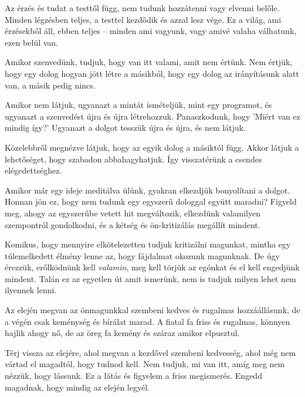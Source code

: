 Az érzés és tudat a testtől függ, nem tudunk hozzátenni vagy elvenni
belőle. Minden légzésben teljes, a testtel kezdődik és azzal lesz vége.
Ez a világ, ami érzésekből áll, ebben teljes -- minden ami vagyunk, vagy
amivé valaha válhatunk, ezen belül van.

Amikor szenvedünk, tudjuk, hogy van itt valami, amit nem értünk. Nem
értjük, hogy egy dolog hogyan jött létre a másikból, hogy egy dolog az
irányításunk alatt van, a másik pedig nincs.

Amikor nem látjuk, ugyanazt a mintát ismételjük, mint egy programot, és
ugyanazt a szenvedést újra és újra létrehozzuk. Panaszkodunk, hogy
'Miért van ez mindig így?' Ugyanazt a dolgot tesszük újra és újra, és
nem látjuk.

Közelebbről megnézve látjuk, hogy az egyik dolog a másiktól függ. Akkor
látjuk a lehetőséget, hogy szabadon abbahagyhatjuk. Így visszatérünk a
csendes elégedettséghez.

Amikor már egy ideje meditálva ülünk, gyakran elkezdjük bonyolítani a
dolgot. Honnan jön ez, hogy nem tudunk egy egyszerű dologgal együtt
maradni? Figyeld meg, ahogy az egyszerűbe vetett hit megváltozik,
elkezdünk valamilyen szempontról gondolkodni, és a kétség és
ön-kritizálás megállít mindent.

Komikus, hogy mennyire elkötelezetten tudjuk kritizálni magunkat, mintha
egy túlemelkedett élmény lenne az, hogy fájdalmat okozunk magunknak. De
úgy érezzük, erőlködnünk kell \emph{valamin}, meg kell törjük az egónkat
és el kell engedjünk mindent. Talán ez az egyetlen út amit ismerünk, nem
is tudjuk milyen lehet nem ilyennek lenni.

Az elején megvan az önmagunkkal szembeni kedves és rugalmas
hozzáállásunk, de a végén csak keménység és bírálat marad. A fiatal fa
friss és rugalmas, könnyen hajlik ahogy nő, de az öreg fa kemény és
száraz amikor elpusztul.

Térj vissza az elejére, ahol megvan a kezdővel szembeni kedvesség, ahol
még nem vártad el magadtól, hogy tudnod kell. Nem tudjuk, mi van itt,
amíg meg nem nézzük, hogy lássunk. Ez a látás és figyelem a friss
megismerés. Engedd magadnak, hogy mindig az elején legyél.
